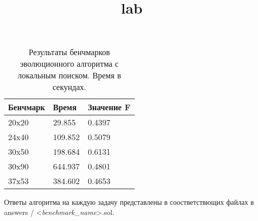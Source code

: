 \documentclass{article}
\title{lab}
\author{}
\date{}
\begin{document}
\setlength{\parindent}{35pt}
\setlength{\footnotemargin}{5pt}
\sloppy
\frenchspacing %



\begin{table}[!h]
    \begin{center}
        \begin{tabular}{ | m{4.2em} | m{5em} | m{5em} |}
            \hline
            Бенчмарк & Время   & Значение F \\
            \hline
            20x20    & 29.855  & 0.4397     \\
            \hline
            24x40    & 109.852 & 0.5079     \\
            \hline
            30x50    & 198.684 & 0.6131     \\
            \hline
            30x90    & 644.937 & 0.4801     \\
            \hline
            37x53    & 384.602 & 0.4653     \\
            \hline
        \end{tabular}
        \caption{Результаты бенчмарков эволюционного алгоритма с локальным поиском. Время в секундах.}
    \end{center}
\end{table}

Ответы алгоритма на каждую задачу представлены в соостветствющих файлах в
answers / <\textit{benchmark\_name}>.sol.
\end{document}
